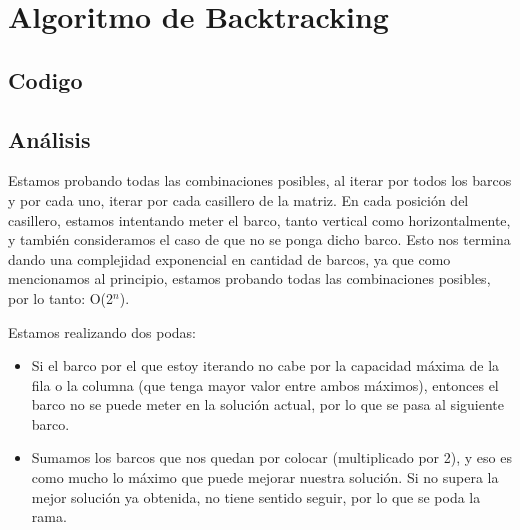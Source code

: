 \section{Algoritmo de Backtracking}
\label{sec:backtracking}

\subsection{Codigo}



\subsection{Análisis}

Estamos probando todas las combinaciones posibles, al iterar por todos los barcos y por cada uno, iterar por cada casillero de la matriz. En cada posición del casillero, estamos intentando meter el barco, tanto vertical como horizontalmente, y también consideramos el caso de que no se ponga dicho barco. Esto nos termina dando una complejidad exponencial en cantidad de barcos, ya que como mencionamos al principio, estamos probando todas las combinaciones posibles, por lo tanto: O(2$^n$).

Estamos realizando dos podas:

\begin{itemize}
    \item Si el barco por el que estoy iterando no cabe por la capacidad máxima de la fila o la columna (que tenga mayor valor entre ambos máximos), entonces el barco no se puede meter en la solución actual, por lo que se pasa al siguiente barco. 
    \item Sumamos los barcos que nos quedan por colocar (multiplicado por 2), y eso es como mucho lo máximo que puede mejorar nuestra solución. Si no supera la mejor solución ya obtenida, no tiene sentido seguir, por lo que se poda la rama.
\end{itemize}